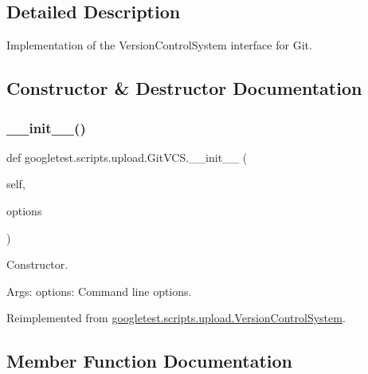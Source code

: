 \subsection{Detailed Description}
\begin{DoxyVerb}Implementation of the VersionControlSystem interface for Git.\end{DoxyVerb}
 

\subsection{Constructor \& Destructor Documentation}
\mbox{\label{classgoogletest_1_1scripts_1_1upload_1_1_git_v_c_s_a855833d850b297b23bee62796275adb7}} 
\subsubsection{\texorpdfstring{\_\_init\_\_()}{\_\_init\_\_()}}
{\footnotesize\ttfamily def googletest.\+scripts.\+upload.\+Git\+V\+C\+S.\+\_\+\+\_\+init\+\_\+\+\_\+ (\begin{DoxyParamCaption}\item[{}]{self,  }\item[{}]{options }\end{DoxyParamCaption})}

\begin{DoxyVerb}Constructor.

Args:
  options: Command line options.
\end{DoxyVerb}
 

Reimplemented from \mbox{\hyperlink{classgoogletest_1_1scripts_1_1upload_1_1_version_control_system_a9dacd7672221771e0daf316d8c53e11c}{googletest.\+scripts.\+upload.\+Version\+Control\+System}}.



\subsection{Member Function Documentation}
\mbox{\label{classgoogletest_1_1scripts_1_1upload_1_1_git_v_c_s_a0f17ec6f907aa737ac9b7c5d06f85884}} 
